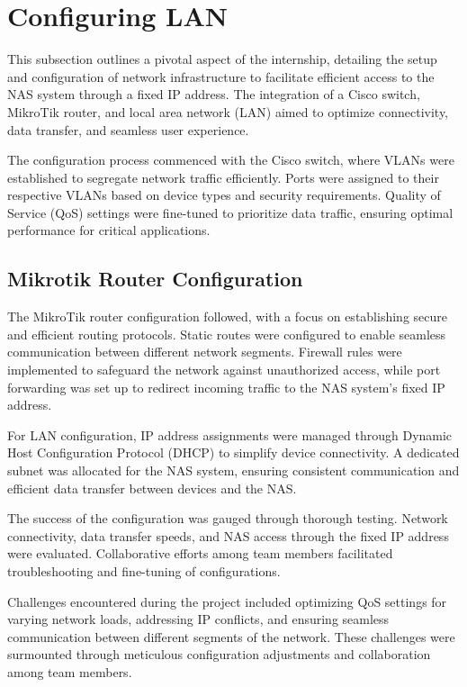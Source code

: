 \section{Configuring LAN }
This subsection outlines a pivotal aspect of the internship, detailing the setup and configuration of network infrastructure to facilitate efficient access to the NAS system through a fixed IP address. The integration of a Cisco switch, MikroTik router, and local area network (LAN) aimed to optimize connectivity, data transfer, and seamless user experience.

The configuration process commenced with the Cisco switch, where VLANs were established to segregate network traffic efficiently. Ports were assigned to their respective VLANs based on device types and security requirements. Quality of Service (QoS) settings were fine-tuned to prioritize data traffic, ensuring optimal performance for critical applications.

\subsection{Mikrotik Router Configuration}
The MikroTik router configuration followed, with a focus on establishing secure and efficient routing protocols. Static routes were configured to enable seamless communication between different network segments. Firewall rules were implemented to safeguard the network against unauthorized access, while port forwarding was set up to redirect incoming traffic to the NAS system's fixed IP address.

For LAN configuration, IP address assignments were managed through Dynamic Host Configuration Protocol (DHCP) to simplify device connectivity. A dedicated subnet was allocated for the NAS system, ensuring consistent communication and efficient data transfer between devices and the NAS.

The success of the configuration was gauged through thorough testing. Network connectivity, data transfer speeds, and NAS access through the fixed IP address were evaluated. Collaborative efforts among team members facilitated troubleshooting and fine-tuning of configurations.

Challenges encountered during the project included optimizing QoS settings for varying network loads, addressing IP conflicts, and ensuring seamless communication between different segments of the network. These challenges were surmounted through meticulous configuration adjustments and collaboration among team members.

